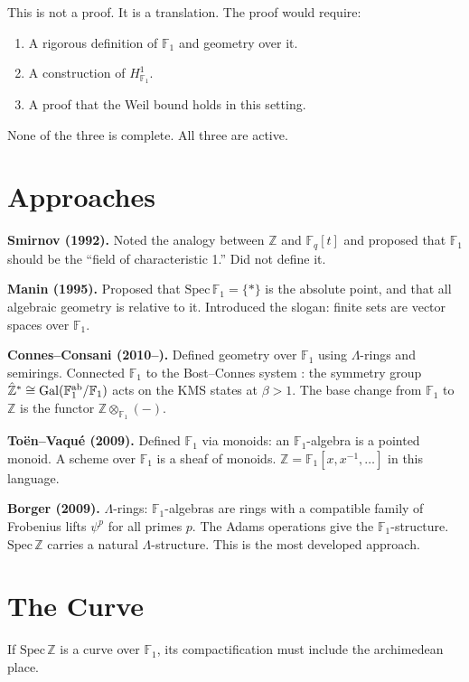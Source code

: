 \documentclass[12pt]{article}
\theoremstyle{definition}
\theoremstyle{remark}
\begin{document}
This is not a proof.
It is a translation.
The proof would require:
\begin{enumerate}
\item A rigorous definition of $\mathbb{F}_1$ and geometry over it.
\item A construction of $H^1_{\mathbb{F}_1}$.
\item A proof that the Weil bound holds in this setting.
\end{enumerate}
None of the three is complete.
All three are active.

\section{Approaches}

\textbf{Smirnov (1992).}
Noted the analogy between $\mathbb{Z}$ and $\mathbb{F}_q[t]$
and proposed that $\mathbb{F}_1$ should be the ``field of characteristic 1.''
Did not define it.

\textbf{Manin (1995).}
Proposed that $\mathrm{Spec}\,\mathbb{F}_1 = \{*\}$ is the absolute point,
and that all algebraic geometry is relative to it.
Introduced the slogan: finite sets are vector spaces over $\mathbb{F}_1$.

\textbf{Connes--Consani (2010--).}
Defined geometry over $\mathbb{F}_1$ using $\Lambda$-rings and semirings.
Connected $\mathbb{F}_1$ to the Bost--Connes system \cite{bostconnes}:
the symmetry group $\hat{\mathbb{Z}}^* \cong \mathrm{Gal}(\mathbb{F}_1^{\rm ab}/\mathbb{F}_1)$
acts on the KMS states at $\beta > 1$.
The base change from $\mathbb{F}_1$ to $\mathbb{Z}$ is the functor
$\mathbb{Z} \otimes_{\mathbb{F}_1} (-)$.

\textbf{To\"{e}n--Vaqu\'{e} (2009).}
Defined $\mathbb{F}_1$ via monoids: an $\mathbb{F}_1$-algebra is a pointed monoid.
A scheme over $\mathbb{F}_1$ is a sheaf of monoids.
$\mathbb{Z} = \mathbb{F}_1[x, x^{-1}, \ldots]$ in this language.

\textbf{Borger (2009).}
$\Lambda$-rings: $\mathbb{F}_1$-algebras are rings with a compatible
family of Frobenius lifts $\psi^p$ for all primes $p$.
The Adams operations give the $\mathbb{F}_1$-structure.
$\mathrm{Spec}\,\mathbb{Z}$ carries a natural $\Lambda$-structure.
This is the most developed approach.

\section{The Curve}

If $\mathrm{Spec}\,\mathbb{Z}$ is a curve over $\mathbb{F}_1$,
its compactification must include the archimedean place.
\end{document}
